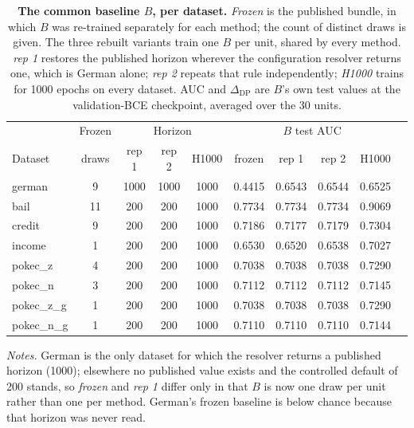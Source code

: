 \begin{table}[t]
\centering
\caption{\textbf{The common baseline \(B\), per dataset.}
\emph{Frozen} is the published bundle, in which \(B\) was re-trained separately for each method; the count of distinct draws is given. The three rebuilt variants train one \(B\) per unit, shared by every method.
\emph{rep 1} restores the published horizon wherever the configuration resolver returns one, which is German alone; \emph{rep 2} repeats that rule independently; \emph{H1000} trains for 1000 epochs on every dataset.
AUC and \(\Delta_{\mathrm{DP}}\) are \(B\)'s own test values at the validation-BCE checkpoint, averaged over the 30 units.}
\label{tab:baseline_spec}
\vspace{-0.2cm}
\scriptsize
\setlength{\tabcolsep}{4pt}
\renewcommand{\arraystretch}{1.05}
\begin{tabular}{lccccccccc}
\toprule
& \multicolumn{1}{c}{Frozen} & \multicolumn{3}{c}{Horizon} & \multicolumn{4}{c}{\(B\) test AUC} \\
\cmidrule(lr){2-2} \cmidrule(lr){3-5} \cmidrule(l){6-9}
Dataset & draws & rep 1 & rep 2 & H1000 & frozen & rep 1 & rep 2 & H1000 \\
\midrule
german & 9 & 1000 & 1000 & 1000 & 0.4415 & 0.6543 & 0.6544 & 0.6525 \\
bail & 11 & 200 & 200 & 1000 & 0.7734 & 0.7734 & 0.7734 & 0.9069 \\
credit & 9 & 200 & 200 & 1000 & 0.7186 & 0.7177 & 0.7179 & 0.7304 \\
income & 1 & 200 & 200 & 1000 & 0.6530 & 0.6520 & 0.6538 & 0.7027 \\
pokec\_z & 4 & 200 & 200 & 1000 & 0.7038 & 0.7038 & 0.7038 & 0.7290 \\
pokec\_n & 3 & 200 & 200 & 1000 & 0.7112 & 0.7112 & 0.7112 & 0.7145 \\
pokec\_z\_g & 1 & 200 & 200 & 1000 & 0.7038 & 0.7038 & 0.7038 & 0.7290 \\
pokec\_n\_g & 1 & 200 & 200 & 1000 & 0.7110 & 0.7110 & 0.7110 & 0.7144 \\
\bottomrule
\end{tabular}

\vspace{2pt}
\begin{minipage}{0.96\columnwidth}
\footnotesize
\textit{Notes.}
German is the only dataset for which the resolver returns a published horizon (1000); elsewhere no published value exists and the controlled default of 200 stands, so \emph{frozen} and \emph{rep 1} differ only in that \(B\) is now one draw per unit rather than one per method.
German's frozen baseline is below chance because that horizon was never read.
\end{minipage}
\end{table}
